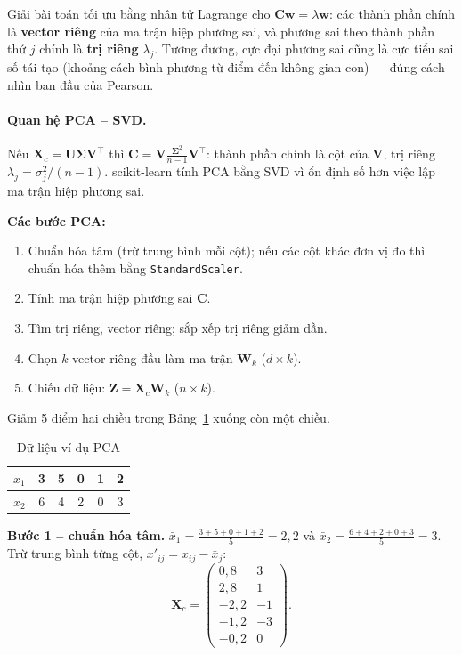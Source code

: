 Giải bài toán tối ưu bằng nhân tử Lagrange cho $\mathbf{C}\mathbf{w} = \lambda\mathbf{w}$: các thành phần chính là \textbf{vector riêng} của ma trận hiệp phương sai, và phương sai theo thành phần thứ $j$ chính là \textbf{trị riêng} $\lambda_j$. Tương đương, cực đại phương sai cũng là cực tiểu sai số tái tạo (khoảng cách bình phương từ điểm đến không gian con) --- đúng cách nhìn ban đầu của Pearson.

\paragraph{Quan hệ PCA -- SVD.} Nếu $\mathbf{X}_c = \mathbf{U}\boldsymbol{\Sigma}\mathbf{V}^{\top}$ thì $\mathbf{C} = \mathbf{V}\frac{\boldsymbol{\Sigma}^2}{n - 1}\mathbf{V}^{\top}$: thành phần chính là cột của $\mathbf{V}$, trị riêng $\lambda_j = \sigma_j^2 / (n - 1)$. scikit-learn tính PCA bằng SVD vì ổn định số hơn việc lập ma trận hiệp phương sai.

\noindent\textbf{Các bước PCA:}
\begin{enumerate}
    \item Chuẩn hóa tâm (trừ trung bình mỗi cột); nếu các cột khác đơn vị đo thì chuẩn hóa thêm bằng \texttt{StandardScaler}.
    \item Tính ma trận hiệp phương sai $\mathbf{C}$.
    \item Tìm trị riêng, vector riêng; sắp xếp trị riêng giảm dần.
    \item Chọn $k$ vector riêng đầu làm ma trận $\mathbf{W}_k$ ($d \times k$).
    \item Chiếu dữ liệu: $\mathbf{Z} = \mathbf{X}_c\mathbf{W}_k$ ($n \times k$).
\end{enumerate}

\begin{example}
Giảm 5 điểm hai chiều trong Bảng~\ref{tab:pca-data} xuống còn một chiều.
\end{example}

\begin{table}[H]
\centering
\begin{tabular}{|c|ccccc|}
\hline
$x_1$ & 3 & 5 & 0 & 1 & 2 \\ \hline
$x_2$ & 6 & 4 & 2 & 0 & 3 \\ \hline
\end{tabular}
\caption{Dữ liệu ví dụ PCA}
\label{tab:pca-data}
\end{table}

\noindent\textbf{Bước 1 -- chuẩn hóa tâm.} $\bar{x}_1 = \frac{3 + 5 + 0 + 1 + 2}{5} = 2{,}2$ và $\bar{x}_2 = \frac{6 + 4 + 2 + 0 + 3}{5} = 3$. Trừ trung bình từng cột, $x'_{ij} = x_{ij} - \bar{x}_j$:
\[
    \mathbf{X}_c = \begin{pmatrix} 0{,}8 & 3 \\ 2{,}8 & 1 \\ -2{,}2 & -1 \\ -1{,}2 & -3 \\ -0{,}2 & 0 \end{pmatrix}.
\]

